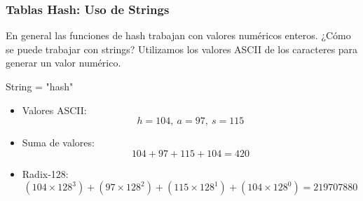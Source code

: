 \documentclass{beamer}
\begin{document}
\begin{frame}[fragile]
 \frametitle{Tablas Hash: Uso de Strings}
\small
En general las funciones de hash trabajan con valores numéricos enteros. ¿Cómo se puede trabajar con strings? Utilizamos los valores ASCII de los caracteres para generar un valor numérico.

\begin{exampleblock}{String = "hash"}
\footnotesize
\begin{itemize}
\item Valores ASCII:
$$h = 104,\ a=97,\ s=115$$
\item Suma de valores: 
$$104+97+115+104 = 420 $$
\item Radix-128:
$$(104\times 128^3) + (97 \times 128^2) + (115\times 128^1) + (104\times 128^0) = 219707880 $$
\end{itemize}

\end{exampleblock}

\end{frame}
\end{document}
